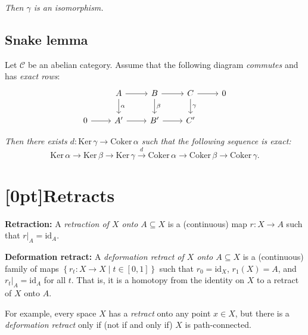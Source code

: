 \documentclass[10pt]{article}
\newcommand{\ccat}{\mathcal{C}}
\newcommand{\Coker}{\mathrm{Coker}\,}
\newcommand{\Ker}{\mathrm{Ker}\,}
\newcommand{\AT}{\textcolor{violet}{AT}}
\begin{document}
            \medskip

            \emph{Then $\gamma$ is an isomorphism.}

        \subsection{Snake lemma}

            Let $\ccat$ be an abelian category.
            Assume that the following diagram \emph{commutes} and has \emph{exact rows}:
            \begin{equation*}
                \begin{tikzcd}
                    & A \rar \dar{\alpha} & B \rar \dar{\beta} & C \rar \dar{\gamma} & 0\\
                    0 \rar & A' \rar & B' \rar & C' &
                \end{tikzcd}
            \end{equation*}

            \emph{Then there exists $d\colon\Ker\gamma\to\Coker\alpha$ such that the following sequence is exact:}
            \begin{equation*}
                \Ker\alpha\to\Ker\beta\to\Ker\gamma\xrightarrow{d}\Coker\alpha\to\Coker\beta\to\Coker\gamma.
            \end{equation*}


    \clearpage

    \section{\protect\marginnote{\AT}[0pt]Retracts}

        \textbf{Retraction:} A \emph{retraction of $X$ onto $A\subseteq X$} is a (continuous) map $r\colon X\to A$ such that $r|_A=\mathrm{id}_A$.

        \smallskip

        \textbf{Deformation retract:} A \emph{deformation retract of $X$ onto $A\subseteq X$} is a (continuous) family of maps $\left\{r_t\colon X\to X\mid t\in[0,1]\right\}$ such that $r_0=\mathrm{id}_X$, $r_1(X)=A$, and $r_t|_A=\mathrm{id}_A$ for all $t$.
        That is, it is a homotopy from the identity on $X$ to a retract of $X$ onto $A$.

        \smallskip

        For example, every space $X$ has a \emph{retract} onto any point $x\in X$, but there is a \emph{deformation retract} only if (not if and only if) $X$ is path-connected.
\end{document}
